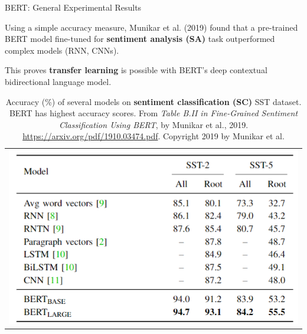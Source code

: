 \begin{frame}{BERT: General Experimental Results}

    \begin{itemizeSpaced}{2pt}
        \item Using a simple accuracy measure, Munikar et al. (2019) found that a pre-trained BERT model fine-tuned for \textbf{sentiment analysis (SA)} task outperformed complex models (RNN, CNNs).
        
        \pinkbox This proves \textbf{transfer learning} is possible with BERT's deep contextual bidirectional language model. 
    \end{itemizeSpaced}



    \begin{table}[ht!]
      \centering
      \vspace{-7pt}
      
      \begin{tabular}{ c }
      
        \begin{minipage}{.7\textwidth}
          \includegraphics[width=\linewidth]{imgs/table_bert_vsOtherModels.png}
        \end{minipage}
        \vspace{-7pt}
      
      \end{tabular}
      
      \caption{\linespread{0.3} \footnotesize Accuracy (\%) of several models on \textbf{sentiment classification (SC)} SST dataset. BERT has highest accuracy scores. From \emph{Table B.II in Fine-Grained Sentiment Classification Using BERT}, by Munikar et al., 2019. \url{https://arxiv.org/pdf/1910.03474.pdf}. Copyright 2019 by Munikar et al.}
      \label{tbl:bertExperimentResults}
      \vspace{-10pt}
    \end{table}
    
\end{frame}



